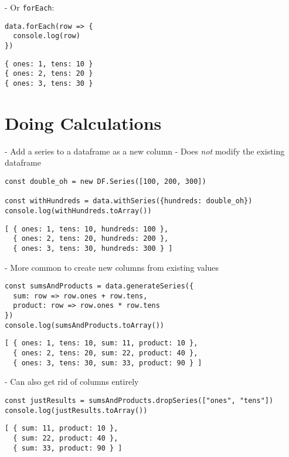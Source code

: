 -   Or \texttt{forEach}:

\begin{verbatim}
data.forEach(row => {
  console.log(row)
})
\end{verbatim}

\begin{verbatim}
{ ones: 1, tens: 10 }
{ ones: 2, tens: 20 }
{ ones: 3, tens: 30 }
\end{verbatim}

\section{Doing Calculations}\label{s:dataforge-calc}

-   Add a series to a dataframe as a new column
    -   Does \emph{not} modify the existing dataframe

\begin{verbatim}
const double_oh = new DF.Series([100, 200, 300])

const withHundreds = data.withSeries({hundreds: double_oh})
console.log(withHundreds.toArray())
\end{verbatim}

\begin{verbatim}
[ { ones: 1, tens: 10, hundreds: 100 },
  { ones: 2, tens: 20, hundreds: 200 },
  { ones: 3, tens: 30, hundreds: 300 } ]
\end{verbatim}

-   More common to create new columns from existing values

\begin{verbatim}
const sumsAndProducts = data.generateSeries({
  sum: row => row.ones + row.tens,
  product: row => row.ones * row.tens
})
console.log(sumsAndProducts.toArray())
\end{verbatim}

\begin{verbatim}
[ { ones: 1, tens: 10, sum: 11, product: 10 },
  { ones: 2, tens: 20, sum: 22, product: 40 },
  { ones: 3, tens: 30, sum: 33, product: 90 } ]
\end{verbatim}

-   Can also get rid of columns entirely

\begin{verbatim}
const justResults = sumsAndProducts.dropSeries(["ones", "tens"])
console.log(justResults.toArray())
\end{verbatim}

\begin{verbatim}
[ { sum: 11, product: 10 },
  { sum: 22, product: 40 },
  { sum: 33, product: 90 } ]
\end{verbatim}

